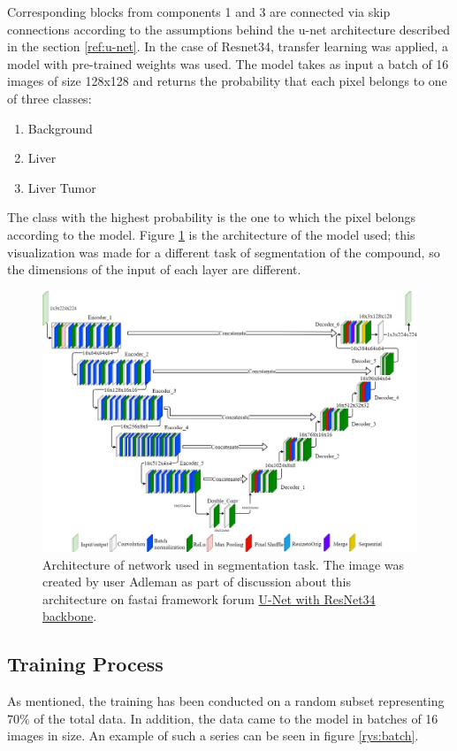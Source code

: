 Corresponding blocks from components 1 and 3 are connected via skip connections according to the assumptions behind the u-net architecture described in the section \ref{ref:u-net}. In the case of Resnet34, transfer learning was applied, a model with pre-trained weights was used. The model takes as input a batch of 16 images of size 128x128 and returns the probability that each pixel belongs to one of three classes:
\begin{enumerate}
    \item Background
    \item Liver
    \item Liver Tumor
\end{enumerate}
The class with the highest probability is the one to which the pixel belongs according to the model. Figure \ref{rys:my_arch} is the architecture of the model used; this visualization was made for a different task of segmentation of the compound, so the dimensions of the input of each layer are different.
\begin{figure}[!h]
	\centering \includegraphics[width=\linewidth]{rysunki/135d5facd772ae16cee7360d0a0bbea8c74d5398_2_1380x962.jpeg}
	\caption{Architecture of network used in segmentation task. The image was created by user Adleman as part of discussion about this architecture on fastai framework forum \href{https://forums.fast.ai/t/u-net-with-resnet34-backbone/85744/4}{U-Net with ResNet34 backbone}.}
	\label{rys:my_arch}
\end{figure}

\subsection{Training Process}
As mentioned, the training has been conducted on a random subset representing $70\%$ of the total data. In addition, the data came to the model in batches of 16 images in size. An example of such a series can be seen in figure \ref{rys:batch}.


